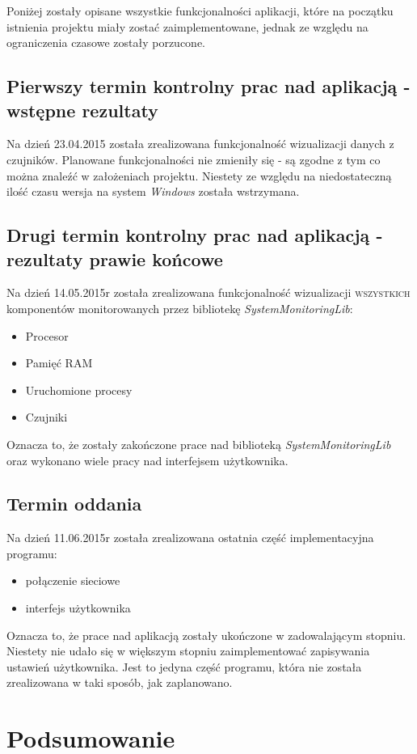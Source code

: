\documentclass[a4paper]{article}
\begin{document}
Poniżej zostały opisane wszystkie funkcjonalności aplikacji, które na początku istnienia projektu
miały zostać zaimplementowane, jednak ze względu na ograniczenia czasowe zostały porzucone.

\subsection{Pierwszy termin kontrolny prac nad aplikacją - wstępne rezultaty}

Na dzień 23.04.2015 została zrealizowana funkcjonalność wizualizacji danych z czujników. Planowane funkcjonalności nie zmieniły się - są zgodne z tym co można znaleźć w założeniach projektu. Niestety ze względu na niedostateczną ilość czasu wersja na system \textit{Windows} została wstrzymana.

\subsection{Drugi termin kontrolny prac nad aplikacją - rezultaty prawie końcowe}
Na dzień 14.05.2015r została zrealizowana funkcjonalność wizualizacji \textsc{wszystkich} komponentów monitorowanych przez bibliotekę \textit{SystemMonitoringLib}:
	\begin{itemize}
		\item Procesor
		\item Pamięć \textsc{RAM}
		\item Uruchomione procesy
		\item Czujniki
	\end{itemize}
Oznacza to, że zostały zakończone prace nad biblioteką \textit{SystemMonitoringLib} oraz wykonano wiele pracy nad interfejsem użytkownika.


\subsection{Termin oddania}
Na dzień 11.06.2015r została zrealizowana ostatnia część implementacyjna programu:
	\begin{itemize}
		\item połączenie sieciowe
		\item interfejs użytkownika
	\end{itemize}
Oznacza to, że prace nad aplikacją zostały ukończone w zadowalającym stopniu. 
Niestety nie udało się w większym stopniu zaimplementować zapisywania ustawień użytkownika. Jest to jedyna
część programu, która nie została zrealizowana w taki sposób, jak zaplanowano.



\section{Podsumowanie}
\end{document}
